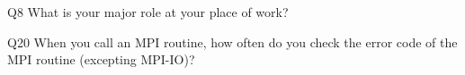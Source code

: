 \begin{description}%
\item{Q8} What is your major role at your place of work?%
\item{Q20} When you call an MPI routine, how often do you check the error code of the MPI routine  (excepting MPI-IO)?%
\end{description}%
